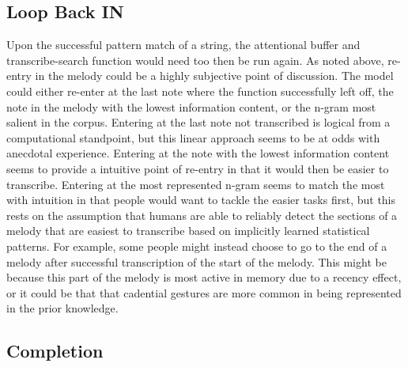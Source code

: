 \documentclass[]{book}
\theoremstyle{definition}
\theoremstyle{definition}
\theoremstyle{definition}
\theoremstyle{remark}
\begin{document}
\hypertarget{loop-back-in}{%
\subsection{Loop Back IN}\label{loop-back-in}}

Upon the successful pattern match of a string, the attentional buffer
and transcribe-search function would need too then be run again. As
noted above, re-entry in the melody could be a highly subjective point
of discussion. The model could either re-enter at the last note where
the function successfully left off, the note in the melody with the
lowest information content, or the n-gram most salient in the corpus.
Entering at the last note not transcribed is logical from a
computational standpoint, but this linear approach seems to be at odds
with anecdotal experience. Entering at the note with the lowest
information content seems to provide a intuitive point of re-entry in
that it would then be easier to transcribe. Entering at the most
represented n-gram seems to match the most with intuition in that people
would want to tackle the easier tasks first, but this rests on the
assumption that humans are able to reliably detect the sections of a
melody that are easiest to transcribe based on implicitly learned
statistical patterns. For example, some people might instead choose to
go to the end of a melody after successful transcription of the start of
the melody. This might be because this part of the melody is most active
in memory due to a recency effect, or it could be that that cadential
gestures are more common in being represented in the prior knowledge.

\hypertarget{completion}{%
\subsection{Completion}\label{completion}}
\end{document}
